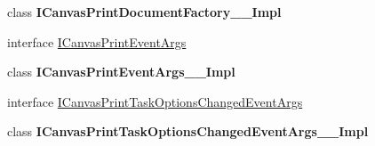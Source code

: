\begin{DoxyCompactItemize}
\item 
class {\bfseries I\+Canvas\+Print\+Document\+Factory\+\_\+\+\_\+\+Impl}
\item 
interface \hyperlink{interface_microsoft_1_1_graphics_1_1_canvas_1_1_printing_1_1_i_canvas_print_event_args}{I\+Canvas\+Print\+Event\+Args}
\item 
class {\bfseries I\+Canvas\+Print\+Event\+Args\+\_\+\+\_\+\+Impl}
\item 
interface \hyperlink{interface_microsoft_1_1_graphics_1_1_canvas_1_1_printing_1_1_i_canvas_print_task_options_changed_event_args}{I\+Canvas\+Print\+Task\+Options\+Changed\+Event\+Args}
\item 
class {\bfseries I\+Canvas\+Print\+Task\+Options\+Changed\+Event\+Args\+\_\+\+\_\+\+Impl}
\end{DoxyCompactItemize}
